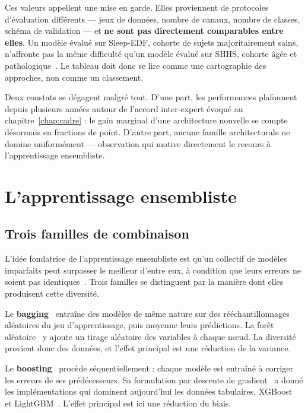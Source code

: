 Ces valeurs appellent une mise en garde. Elles proviennent de protocoles
d'évaluation différents — jeux de données, nombre de canaux, nombre de classes,
schéma de validation — et \textbf{ne sont pas directement comparables entre elles}.
Un modèle évalué sur Sleep-EDF, cohorte de sujets majoritairement sains, n'affronte
pas la même difficulté qu'un modèle évalué sur SHHS, cohorte âgée et
pathologique~\cite{quan1997}. Le tableau doit donc se lire comme une cartographie des
approches, non comme un classement.

Deux constats se dégagent malgré tout. D'une part, les performances plafonnent depuis
plusieurs années autour de l'accord inter-expert évoqué au
chapitre~\ref{chap:cadre} : le gain marginal d'une architecture nouvelle se compte
désormais en fractions de point. D'autre part, aucune famille architecturale ne domine
uniformément — observation qui motive directement le recours à l'apprentissage
ensembliste.

\section{L'apprentissage ensembliste}

\subsection{Trois familles de combinaison}

L'idée fondatrice de l'apprentissage ensembliste est qu'un collectif de modèles
imparfaits peut surpasser le meilleur d'entre eux, à condition que leurs erreurs ne
soient pas identiques~\cite{dietterich2000}. Trois familles se distinguent par la
manière dont elles produisent cette diversité.

Le \textbf{bagging}~\cite{breiman1996} entraîne des modèles de même nature sur des
rééchantillonnages aléatoires du jeu d'apprentissage, puis moyenne leurs prédictions.
La forêt aléatoire~\cite{breiman2001} y ajoute un tirage aléatoire des variables à
chaque nœud. La diversité provient donc des données, et l'effet principal est une
réduction de la variance.

Le \textbf{boosting}~\cite{freund1997} procède séquentiellement : chaque modèle est
entraîné à corriger les erreurs de ses prédécesseurs. Sa formulation par descente de
gradient~\cite{friedman2001} a donné les implémentations qui dominent aujourd'hui les
données tabulaires, XGBoost~\cite{chen2016} et LightGBM~\cite{ke2017}. L'effet
principal est ici une réduction du biais.

